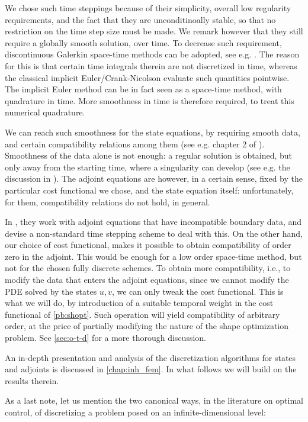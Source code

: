 \documentclass[english,a4paper,9pt,oneside]{scrbook}	%
\theoremstyle{break}
\theoremstyle{remark}
\begin{document}
We chose such time steppings because of their simplicity, overall low regularity requirements, and the fact that they are unconditinoally stable, so that no restriction on the time step size must be made. We remark however that they still require a globally smooth solution, over time. To decrease such requirement, discontinuous Galerkin space-time methods can be adopted, see e.g. \cite{vexler}. The reason for this is that certain time integrals therein are not discretized in time, whereas the classical implicit Euler/Crank-Nicolson evaluate such quantities pointwise. The implicit Euler method can be in fact seen as a space-time method, with quadrature in time. More smoothness in time is therefore required, to treat this numerical quadrature.

We can reach such smoothness for the state equations, by requiring smooth data, and certain compatibility relations among them (see e.g. chapter 2 of \cite{lions}). Smoothness of the data alone is not enough: a regular solution is obtained, but only away from the starting time, where a singularity can develop (see e.g. the discussion in \cite{harbrecht}). The adjoint equations are however, in a certain sense, fixed by the particular cost functional we chose, and the state equation itself: unfortunately, for them, compatibility relations do not hold, in general.

In \cite{harbrecht}, they work with adjoint equations that have incompatible boundary data, and devise a non-standard time stepping scheme to deal with this. On the other hand, our choice of cost functional, makes it possible to obtain compatibility of order zero in the adjoint. This would be enough for a low order space-time method, but not for the chosen fully discrete schemes. To obtain more compatibility, i.e., to modify the data that enters the adjoint equations, since we cannot modify the PDE solved by the states $u,v$, we can only tweak the cost functional. This is what we will do, by introduction of a suitable temporal weight in the cost functional of \cref{pb:shopt}. Such operation will yield compatibility of arbitrary order, at the price of partially modifying the nature of the shape optimization problem. See \cref{sec:o-t-d} for a more thorough discussion.

An in-depth presentation and analysis of the discretization algorithms for states and adjoints is discussed in \cref{chap:inh_fem}. In what follows we will build on the results therein.

As a last note, let us mention the two canonical ways, in the literature on optimal control, of discretizing a problem posed on an infinite-dimensional level:
\end{document}
